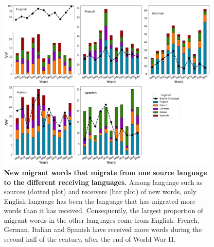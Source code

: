 \documentclass[10pt,letterpaper]{article} %
\begin{document}
	\begin{figure}[!h] %
		\begin{adjustwidth}{-1.2in}{0in}
			\includegraphics[scale=.35]{NW_A.png}
			\caption{{\bf New migrant words that migrate from one source language to the different receiving languages.} Among language such as sources (dotted plot) and receivers (bar plot) of new words, only English language has been the language that has migrated more words than it has received. Consequently, the largest proportion of migrant words in the other languages ​​come from English. French, German, Italian and Spanish have received more words during the second half of the century, after the end of World War II.	
			}
			\label{fig.NMW_A}
		\end{adjustwidth}
	\end{figure} %
	
	
	
	
\end{document}
